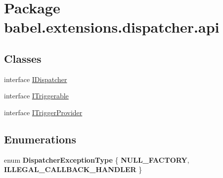 \hypertarget{namespacebabel_1_1extensions_1_1dispatcher_1_1api}{\section{Package babel.\-extensions.\-dispatcher.\-api}
\label{namespacebabel_1_1extensions_1_1dispatcher_1_1api}
}
\subsection*{Classes}
\begin{DoxyCompactItemize}
\item 
interface \hyperlink{interfacebabel_1_1extensions_1_1dispatcher_1_1api_1_1_i_dispatcher}{I\-Dispatcher}
\item 
interface \hyperlink{interfacebabel_1_1extensions_1_1dispatcher_1_1api_1_1_i_triggerable}{I\-Triggerable}
\item 
interface \hyperlink{interfacebabel_1_1extensions_1_1dispatcher_1_1api_1_1_i_trigger_provider}{I\-Trigger\-Provider}
\end{DoxyCompactItemize}
\subsection*{Enumerations}
\begin{DoxyCompactItemize}
\item 
enum {\bfseries Dispatcher\-Exception\-Type} \{ {\bfseries N\-U\-L\-L\-\_\-\-F\-A\-C\-T\-O\-R\-Y}, 
{\bfseries I\-L\-L\-E\-G\-A\-L\-\_\-\-C\-A\-L\-L\-B\-A\-C\-K\-\_\-\-H\-A\-N\-D\-L\-E\-R}
 \}
\end{DoxyCompactItemize}
